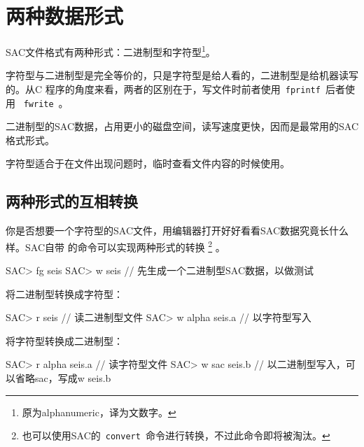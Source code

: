 \section{两种数据形式}
SAC文件格式有两种形式：二进制型和字符型\footnote{原为alphanumeric，译为文数字。}。

字符型与二进制型是完全等价的，只是字符型是给人看的，二进制型是给机器读写的。从C
程序的角度来看，两者的区别在于，写文件时前者使用~\lstinline{fprintf}~后者使用
~\lstinline{fwrite}~。

二进制型的SAC数据，占用更小的磁盘空间，读写速度更快，因而是最常用的SAC格式形式。

字符型适合于在文件出现问题时，临时查看文件内容的时候使用。

\subsection{两种形式的互相转换}
你是否想要一个字符型的SAC文件，用编辑器打开好好看看SAC数据究竟长什么样。SAC自带
的命令可以实现两种形式的转换
\footnote{也可以使用SAC的~\lstinline{convert}~命令进行转换，不过此命令即将被淘汰。}
。
\begin{SACCode}
SAC> fg seis
SAC> w seis             // 先生成一个二进制型SAC数据，以做测试
\end{SACCode}

将二进制型转换成字符型：
\begin{SACCode}
SAC> r seis             // 读二进制型文件
SAC> w alpha seis.a     // 以字符型写入
\end{SACCode}

将字符型转换成二进制型：
\begin{SACCode}
SAC> r alpha seis.a     // 读字符型文件
SAC> w sac seis.b       // 以二进制型写入，可以省略sac，写成w seis.b
\end{SACCode}

